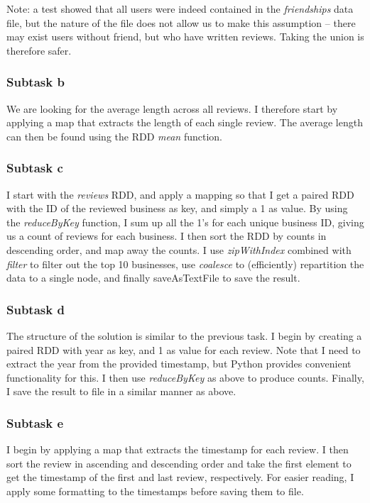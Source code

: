 \documentclass[a4paper]{article}
\begin{document}
Note: a test showed that all users were indeed contained in the \emph{friendships} data file, but the nature of the file does not allow us to make this assumption -- there may exist users without friend, but who have written reviews. Taking the union is therefore safer.

\subsubsection{Subtask b}
We are looking for the average length across all reviews. I therefore start by applying a map that extracts the length of each single review. The average length can then be found using the RDD \emph{mean} function.

\subsubsection{Subtask c}
I start with the \emph{reviews} RDD, and apply a mapping so that I get a paired RDD with the ID of the reviewed business as key, and simply a 1 as value. By using the \emph{reduceByKey} function, I sum up all the 1's for each unique business ID, giving us a count of reviews for each business. I then sort the RDD by counts in descending order, and map away the counts. I use \emph{zipWithIndex} combined with \emph{filter} to filter out the top 10 businesses, use \emph{coalesce} to (efficiently) repartition the data to a single node, and finally saveAsTextFile to save the result.

\subsubsection{Subtask d}
The structure of the solution is similar to the previous task. I begin by creating a paired RDD with year as key, and 1 as value for each review. Note that I need to extract the year from the provided timestamp, but Python provides convenient functionality for this. I then use \emph{reduceByKey} as above to produce counts. Finally, I save the result to file in a similar manner as above.

\subsubsection{Subtask e}
I begin by applying a map that extracts the timestamp for each review. I then sort the review in ascending and descending order and take the first element to get the timestamp of the first and last review, respectively. For easier reading, I apply some formatting to the timestamps before saving them to file.
\end{document}
